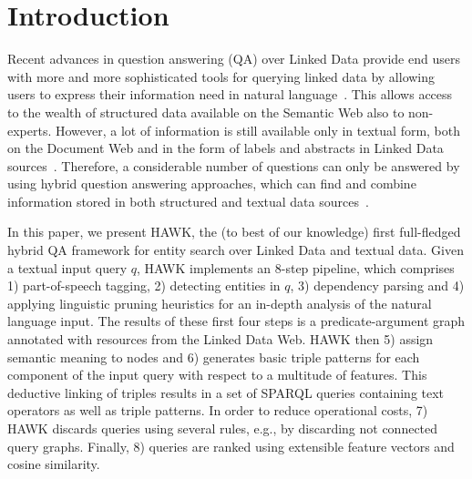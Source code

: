 \section{Introduction}
Recent advances in question answering (QA) over Linked Data provide end users with more and more sophisticated tools for querying linked data by allowing users to express their information need in natural language~\cite{SINA_WebSemantic,tbsl,pythia}. 
This allows access to the wealth of structured data available on the Semantic Web also to non-experts. However, a lot of information is still available only in textual form, both on the Document Web and in the form of labels and abstracts in Linked Data sources~\cite{rdflivenews}.
Therefore, a considerable number of questions can only be answered by using hybrid question answering approaches, which  can find and combine information stored in both structured and textual data sources~\cite{combiningLDandIR}.

In this paper, we present HAWK, the (to best of our knowledge) first full-fledged hybrid QA framework for entity search over Linked Data and textual data. 
Given a textual input query $q$, HAWK implements an 8-step pipeline, which comprises 1) part-of-speech tagging, 2) detecting entities in $q$, 3) dependency parsing and 4) applying linguistic pruning heuristics for an in-depth analysis of the natural language input. 
The results of these first four steps is a predicate-argument graph annotated with resources from the Linked Data Web. HAWK then 5) assign semantic meaning to nodes and 6) generates basic triple patterns for each component of the input query with respect to a multitude of features. 
This deductive linking of triples results in a set of SPARQL queries containing text operators as well as triple patterns.
In order to reduce operational costs, 7) HAWK discards queries using several rules, e.g., by  discarding not connected query graphs.
Finally, 8) queries are ranked using extensible feature vectors and cosine similarity.


